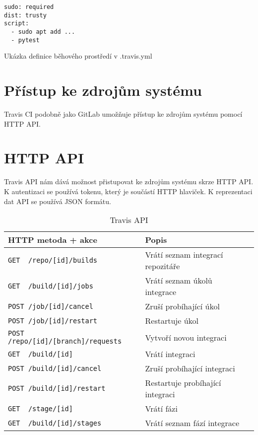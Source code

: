 \begin{listing}[ht]
\begin{verbatim}
sudo: required
dist: trusty
script:
  - sudo apt add ...
  - pytest
\end{verbatim}
\caption{Ukázka definice běhového prostředí v .travis.yml}
\end{listing}

\section{Přístup ke zdrojům systému}

Travis CI podobně jako GitLab umožňuje přístup ke zdrojům systému pomocí HTTP API.

\section{HTTP API}

Travis API nám dává možnost přistupovat ke zdrojům systému skrze HTTP API.
K autentizaci se používá tokenu, který je součástí HTTP hlaviček.
K reprezentaci dat API se používá JSON formátu.

\begin{table}[ht]
\centering
\fontsize{9.5}{11.5}\selectfont
\caption{Travis API}
\label{table:gitlab-api}
\begin{tabular}{|l|l|l|}
\hline
HTTP metoda + akce                                          & Popis \\ \hline
\verb|GET  /repo/[id]/builds|                               & Vrátí seznam integrací repozitáře      \\ \hline
\verb|GET  /build/[id]/jobs|                                & Vrátí seznam úkolů integrace      \\ \hline
\verb|POST /job/[id]/cancel|                                & Zruší probíhající úkol      \\ \hline
\verb|POST /job/[id]/restart|                               & Restartuje úkol      \\ \hline
\verb|POST /repo/[id]/[branch]/requests|                    & Vytvoří novou integraci      \\ \hline
\verb|GET  /build/[id]|                                     & Vrátí integraci      \\ \hline
\verb|POST /build/[id]/cancel|                              & Zruší probíhající integraci      \\ \hline
\verb|POST /build/[id]/restart|                             & Restartuje probíhající integraci      \\ \hline
\verb|GET  /stage/[id]|                                     & Vrátí fázi      \\ \hline
\verb|GET  /build/[id]/stages|                              & Vrátí seznam fází integrace      \\ \hline
\end{tabular}
\end{table}

